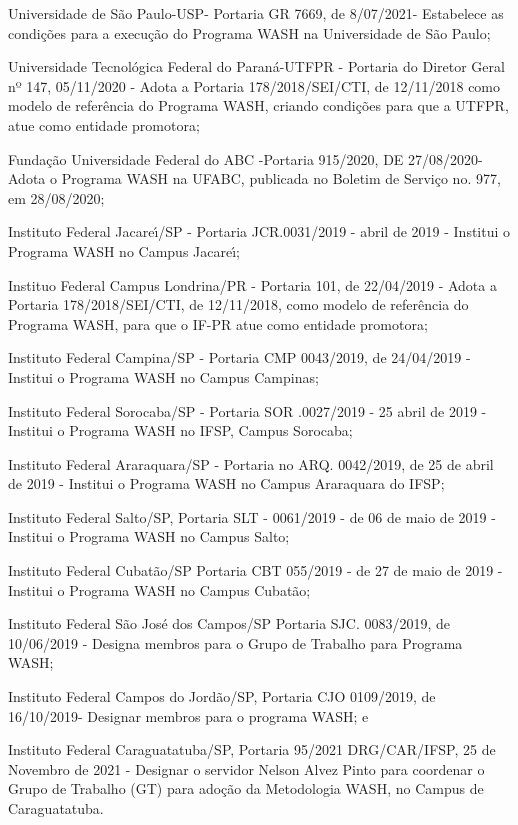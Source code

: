 \documentclass[
12pt,		%
openright,	%
twoside,  %
a4paper,			%
chapter=TITLE,		%
english,			%
french,				%
spanish,			%
brazil				%
]{USPSC-classe/USPSC}
\begin{document}
\begin{alineas}
\item Universidade de S\~ao Paulo-USP- Portaria GR 7669, de 8/07/2021- Estabelece as condi\c{c}\~oes para a execu\c{c}\~ao do Programa WASH na Universidade de S\~ao Paulo;
\item Universidade Tecnol\'ogica Federal do Paran\'a-UTFPR - Portaria do Diretor Geral nº 147, 05/11/2020 - Adota a Portaria 178/2018/SEI/CTI, de 12/11/2018 como modelo de refer\^encia do Programa WASH, criando condi\c{c}\~oes para que a UTFPR, atue como entidade promotora;
\item Funda\c{c}\~ao Universidade Federal do ABC -Portaria 915/2020, DE 27/08/2020- Adota o Programa WASH na UFABC, publicada no Boletim de Servi\c{c}o no. 977, em 28/08/2020;
\item Instituto Federal Jacare\'{\i}/SP - Portaria JCR.0031/2019 - abril de 2019 - Institui o Programa WASH no Campus Jacare\'{\i};
\item Instituo Federal Campus Londrina/PR - Portaria 101, de 22/04/2019 - Adota a Portaria 178/2018/SEI/CTI, de 12/11/2018, como modelo de refer\^encia do Programa WASH, para que o IF-PR atue como entidade promotora;
\item Instituto Federal Campina/SP - Portaria CMP 0043/2019, de 24/04/2019 - Institui o Programa WASH no Campus Campinas;
\item Instituto Federal Sorocaba/SP - Portaria SOR .0027/2019 - 25 abril de 2019 - Institui o Programa WASH no IFSP, Campus Sorocaba;
\item Instituto Federal Araraquara/SP - Portaria no ARQ. 0042/2019, de 25 de abril de 2019 - Institui o Programa WASH no Campus Araraquara do IFSP;
\item Instituto Federal Salto/SP, Portaria SLT - 0061/2019 - de 06 de maio de 2019 - Institui o Programa WASH no Campus Salto;
\item Instituto Federal Cubat\~ao/SP Portaria CBT 055/2019 - de 27 de maio de 2019 - Institui o Programa WASH no Campus Cubat\~ao;
\item Instituto Federal S\~ao Jos\'e dos Campos/SP Portaria  SJC. 0083/2019, de 10/06/2019 - Designa membros para o Grupo de Trabalho para Programa WASH;
\item Instituto Federal Campos do Jord\~ao/SP, Portaria CJO 0109/2019, de 16/10/2019- Designar membros para o programa WASH; e
\item Instituto Federal Caraguatatuba/SP, Portaria 95/2021 DRG/CAR/IFSP, 25 de Novembro de 2021 - Designar o servidor Nelson Alvez Pinto para coordenar o Grupo de Trabalho (GT) para ado\c{c}\~ao da Metodologia WASH, no Campus de Caraguatatuba.
\end{alineas}
\end{document}
